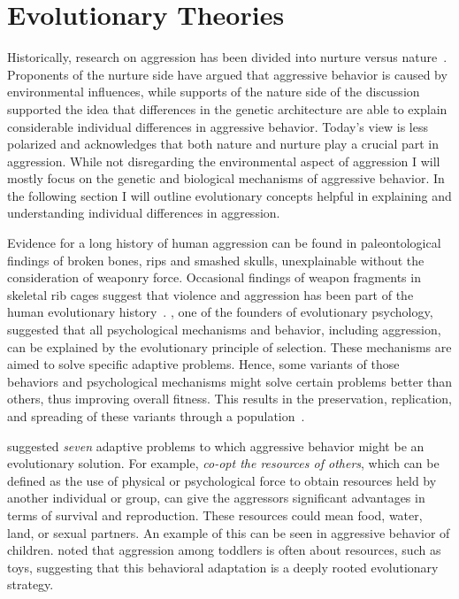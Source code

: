 \section{Evolutionary Theories}
\label{sec:evolutionary_theories}

Historically, research on aggression has been divided into nurture versus nature~\cite{Archer2009}. 
Proponents of the nurture side have argued that aggressive behavior is caused by environmental influences, while supports of the nature side of the discussion supported the idea that differences in the genetic architecture are able to explain considerable individual differences in aggressive behavior.
Today's view is less polarized and acknowledges that both nature and nurture play a crucial part in aggression.
While not disregarding the environmental aspect of aggression I will mostly focus on the genetic and biological mechanisms of aggressive behavior.
In the following section I will outline evolutionary concepts helpful in explaining and understanding individual differences in aggression. 

Evidence for a long history of human aggression can be found in  paleontological findings of broken bones, rips and smashed skulls, unexplainable without the consideration of weaponry force.
Occasional findings of weapon fragments in skeletal rib cages suggest that violence and aggression has been part of the human evolutionary history~\citet{Buss1997}. 
\citet{Buss1997}, one of the founders of evolutionary psychology, suggested that all psychological mechanisms and behavior, including aggression, can be explained by the evolutionary principle of selection.  
These mechanisms are aimed to solve specific adaptive problems.
Hence, some variants of those behaviors and psychological mechanisms might solve certain problems better than others, thus improving overall fitness.
This results in the preservation, replication, and spreading of these variants through a population~\cite{Buss1997}.

\citet{Buss1997} suggested \textit{seven} adaptive problems to which aggressive behavior might be an evolutionary solution.
For example, \textit{co-opt the resources of others}, which can be defined as the use of physical or psychological force to obtain resources held by another individual or group, can give the aggressors significant advantages in terms of survival and reproduction.
These resources could mean food, water, land, or sexual partners.
An example of this can be seen in aggressive behavior of children.
\citet{Campbell1995} noted that aggression among toddlers is often about resources, such as toys, suggesting that this behavioral adaptation is a deeply rooted evolutionary strategy.

